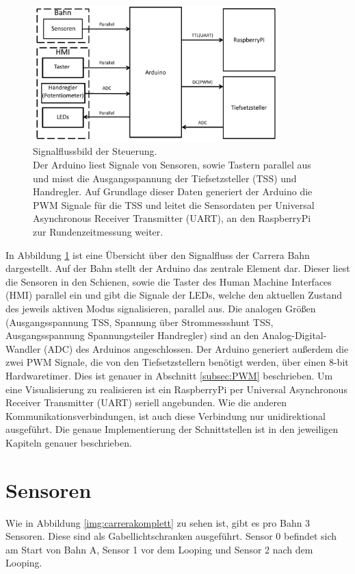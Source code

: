 \documentclass[a4paper, 11pt]{report}
\begin{document}
	\begin{figure}[ht]
		\centering
		\includegraphics[width=0.85\textwidth]{rec/signalfluss.pdf}
		\caption[Signalflussbild der Steuerung]{Signalflussbild der Steuerung. \\Der Arduino liest Signale von Sensoren, sowie Tastern parallel aus und misst die Ausgangsspannung der Tiefsetzsteller (TSS) und Handregler. Auf Grundlage dieser Daten generiert der Arduino die PWM Signale für die TSS und leitet die Sensordaten per Universal Asynchronous Receiver Transmitter (UART), an den RaspberryPi zur Rundenzeitmessung weiter.}
		\label{img:signalfluss}
	\end{figure}
	
	In Abbildung \ref{img:signalfluss} ist eine Übersicht über den Signalfluss der Carrera Bahn dargestellt.
	Auf der Bahn stellt der Arduino das zentrale Element dar.
	Dieser liest die Sensoren in den Schienen, sowie die Taster des Human Machine Interfaces (HMI) parallel ein und gibt die Signale der LEDs, welche den aktuellen Zustand des jeweils aktiven Modus signalisieren, parallel aus.
	Die analogen Größen (Ausgangsspannung TSS, Spannung über Strommessshunt TSS, Ausgangsspannung Spannungsteiler Handregler) sind an den Analog-Digital-Wandler (ADC) des Arduinos angeschlossen.
	Der Arduino generiert außerdem die zwei PWM Signale, die von den Tiefsetzstellern benötigt werden, über einen 8-bit Hardwaretimer.
	Dies ist genauer in Abschnitt \ref{subsec:PWM} beschrieben.
	Um eine Visualisierung zu realisieren ist ein RaspberryPi per Universal Asynchronous Receiver Transmitter (UART) seriell angebunden. Wie die anderen Kommunikationsverbindungen, ist auch diese Verbindung nur unidirektional ausgeführt.
	Die genaue Implementierung der Schnittstellen ist in den jeweiligen Kapiteln genauer beschrieben.

	\section{Sensoren}
		Wie in Abbildung \ref{img:carrerakomplett} zu sehen ist, gibt es pro Bahn 3 Sensoren. Diese sind als Gabellichtschranken ausgeführt. Sensor 0 befindet sich am Start von Bahn A, Sensor 1 vor dem Looping und Sensor 2 nach dem Looping.\\
\end{document}
